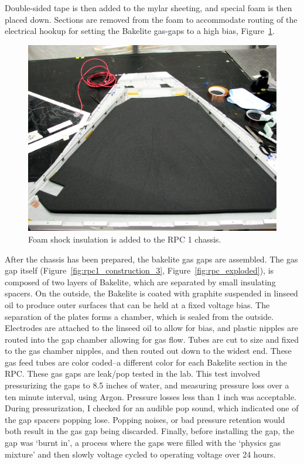 Double-sided tape is then added to the mylar sheeting, and special foam is then
placed down. Sections are removed from the foam to accommodate routing of the
electrical hookup for setting the Bakelite gas-gaps to a high bias,
Figure~\ref{fig:rpc1_construction_2}.

\begin{figure}
  \centering
  \includegraphics[width=0.7\linewidth]{./figures/rpc1_construction_2}
  \caption{
    Foam shock insulation is added to the RPC 1 chassis.
  }
  \label{fig:rpc1_construction_2}
\end{figure}

After the chassis has been prepared, the bakelite gas gaps are assembled. The
gas gap itself (Figure~\ref{fig:rpc1_construction_3},
Figure~\ref{fig:rpc_exploded}), is composed of two layers of Bakelite, which are
separated by small insulating spacers. On the outside, the Bakelite is coated
with graphite suspended in linseed oil to produce outer surfaces that can be
held at a fixed voltage bias.  The separation of the plates forms a chamber,
which is sealed from the outside.  Electrodes are attached to the linseed oil to
allow for bias, and plastic nipples are routed into the gap chamber allowing for
gas flow. Tubes are cut to size and fixed to the gas chamber nipples, and then
routed out down to the widest end. These gas feed tubes are color coded--a
different color for each Bakelite section in the RPC. These gas gaps are
leak/pop tested in the lab.  This test involved pressurizing the gaps to 8.5
inches of water, and measuring pressure loss over a ten minute interval, using
Argon. Pressure losses less than 1 inch was acceptable. During pressurization, I
checked for an audible pop sound, which indicated one of the gap spacers popping
lose. Popping noises, or bad pressure retention would both result in the gas gap
being discarded.  Finally, before installing the gap, the gap was `burnt in', a
process where the gaps were filled with the `physics gas mixture' and then
slowly voltage cycled to operating voltage over 24 hours.

